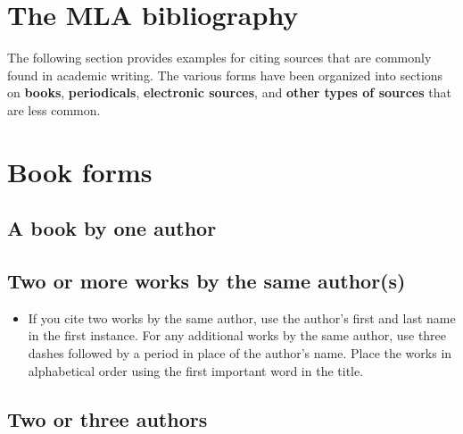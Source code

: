 \newpage



\section{The MLA bibliography}

The following section provides examples for citing sources that are commonly found in
academic writing. The various forms have been organized into sections on \textbf{books}, \textbf{periodicals}, \textbf{electronic sources}, and \textbf{other types of sources} that are less common.


\section{Book forms}

\subsection{A book by one author}


 
\subsection{Two or more works by the same author(s)}

\medskip


\begin{itemize}\item If you cite two works by the same author, use the author's first and last name in the first instance. For any additional works by the same author, use three dashes followed by a period in place of the author's name. Place the works in alphabetical order using the first important word in the title.\end{itemize}

\subsection{Two or three authors}


